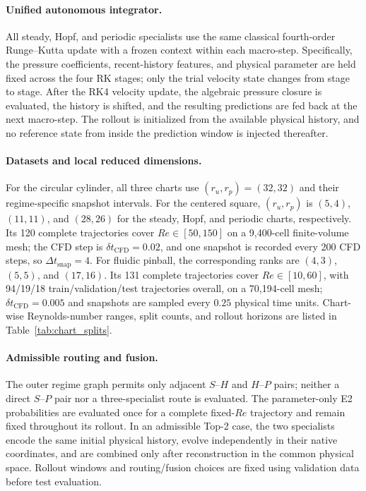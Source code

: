 \paragraph{Unified autonomous integrator.}
All steady, Hopf, and periodic specialists use the same classical fourth-order Runge--Kutta update with a frozen context within each macro-step. Specifically, the pressure coefficients, recent-history features, and physical parameter are held fixed across the four RK stages; only the trial velocity state changes from stage to stage. After the RK4 velocity update, the algebraic pressure closure is evaluated, the history is shifted, and the resulting predictions are fed back at the next macro-step. The rollout is initialized from the available physical history, and no reference state from inside the prediction window is injected thereafter.

\paragraph{Datasets and local reduced dimensions.}
For the circular cylinder, all three charts use $(r_u,r_p)=(32,32)$ and their regime-specific snapshot intervals. For the centered square, $(r_u,r_p)$ is $(5,4)$, $(11,11)$, and $(28,26)$ for the steady, Hopf, and periodic charts, respectively. Its 120 complete trajectories cover $Re\in[50,150]$ on a 9,400-cell finite-volume mesh; the CFD step is $\delta t_{\mathrm{CFD}}=0.02$, and one snapshot is recorded every 200 CFD steps, so $\Delta t_{\mathrm{snap}}=4$. For fluidic pinball, the corresponding ranks are $(4,3)$, $(5,5)$, and $(17,16)$. Its 131 complete trajectories cover $Re\in[10,60]$, with 94/19/18 train/validation/test trajectories overall, on a 70,194-cell mesh; $\delta t_{\mathrm{CFD}}=0.005$ and snapshots are sampled every $0.25$ physical time units. Chart-wise Reynolds-number ranges, split counts, and rollout horizons are listed in Table~\ref{tab:chart_splits}.

\paragraph{Admissible routing and fusion.}
The outer regime graph permits only adjacent $S$--$H$ and $H$--$P$ pairs; neither a direct $S$--$P$ pair nor a three-specialist route is evaluated. The parameter-only E2 probabilities are evaluated once for a complete fixed-$Re$ trajectory and remain fixed throughout its rollout. In an admissible Top-2 case, the two specialists encode the same initial physical history, evolve independently in their native coordinates, and are combined only after reconstruction in the common physical space. Rollout windows and routing/fusion choices are fixed using validation data before test evaluation.

